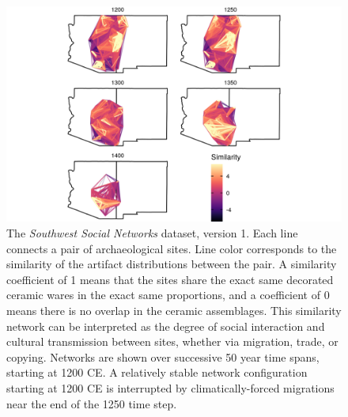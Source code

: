 \documentclass[fleqn,10pt]{wlscirep}
\begin{document}

\begin{figure}[!ht]
\centering
\includegraphics[width=.8\linewidth]{figures/similarity_network.png}
\caption{The \emph{Southwest Social Networks} dataset, version 1. Each line connects a pair of archaeological sites. Line color corresponds to the similarity of the artifact distributions between the pair. A similarity coefficient of 1 means that the sites share the exact same decorated ceramic wares in the exact same proportions, and a coefficient of 0 means there is no overlap in the ceramic assemblages. This similarity network can be interpreted as the degree of social interaction and cultural transmission between sites, whether via migration, trade, or copying. Networks are shown over successive 50 year time spans, starting at 1200 CE. A relatively stable network configuration starting at 1200 CE is interrupted by climatically-forced migrations near the end of the 1250 time step.}
\label{fig:network-plot}
\end{figure}
\end{document}

